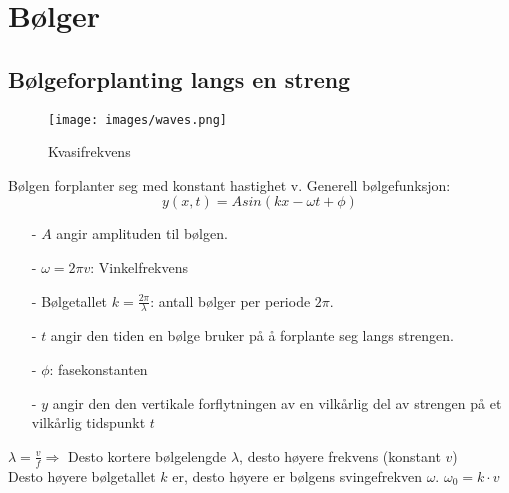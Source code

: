 \documentclass[12pt]{article}
\begin{document}
\section{Bølger}
\subsection{Bølgeforplanting langs en streng}
\begin{figure} [H]
    \centering
    \texttt{[image: images/waves.png]}
    \caption{Kvasifrekvens}
\end{figure}
Bølgen forplanter seg med konstant hastighet v.
Generell bølgefunksjon:
$$y(x,t) = A sin(kx-\omega t + \phi)$$
\begin{itemize}
    \item[-] $A$ angir amplituden til bølgen.
    \item[-] $\omega = 2\pi v$: Vinkelfrekvens
    \item[-] Bølgetallet $k = \frac{2\pi}{\lambda}$: antall bølger per periode $2 \pi$. 
    \item[-] $t$ angir den tiden en bølge bruker på å forplante seg langs strengen.
    \item[-] $\phi$: fasekonstanten
    \item[-] $y$ angir den den vertikale forflytningen av en vilkårlig del av strengen på et vilkårlig tidspunkt $t$
\end{itemize}
$\lambda = \frac{v}{f} \Rightarrow$ Desto kortere bølgelengde $\lambda$, desto høyere frekvens (konstant $v$)\\
Desto høyere bølgetallet $k$ er, desto høyere er bølgens svingefrekven $\omega$. $\omega_0 = k\cdot v$
\end{document}
